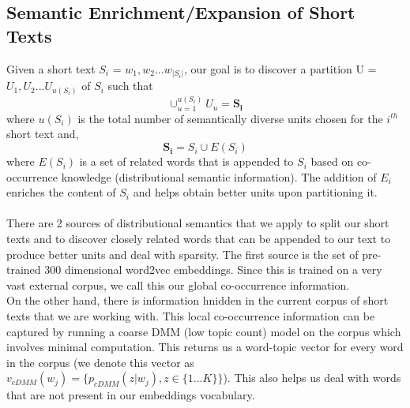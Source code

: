 \documentclass{sig-alternate-05-2015}
\begin{document}
\subsection{Semantic Enrichment/Expansion of Short Texts}
Given a short text $S_{i}$ = ${w_{1},w_{2} ... w_{|S_{i}|}}$, our goal is to discover a partition U = ${U_{1}, U_{2} ... U_{u(S_{i})}}$ of $S_{i}$ such that $$\cup_{u=1}^{u(S_{i})}U_{u} = \mathbf{S_{i}}$$ where $u(S_{i})$ is the total number of semantically diverse units chosen for the $i^{th}$  short text and, $$\mathbf{S_{i}} = S_{i} \cup E(S_{i})$$ where $E(S_{i})$ is a set of related words that is appended to $S_{i}$ based on co-occurrence knowledge (distributional semantic information). The addition of $E_{i}$ enriches the content of $S_{i}$ and helps obtain better units upon partitioning it.
\\
\\
There are 2 sources of distributional semantics that we apply to split our short texts and to discover closely related words that can be appended to our text to produce better units and deal with sparsity. The first source is the set of pre-trained 300 dimensional word2vec embeddings. Since this is trained on a very vast external corpus, we call this our global co-occurrence information.\\ On the other hand, there is information hnidden in the current corpus of short texts that we are working with. This local co-occurrence information can be captured by running a coarse DMM (low topic count) model on the corpus which involves minimal computation. This returns us a word-topic vector for every word in the corpus (we denote this vector as $v_{cDMM}(w_{j}) = \{p_{cDMM}(z|w_{j}), z \in \{1 ... K\}\}$). This also helps us deal with words that are not present in our embeddings vocabulary.
\end{document}
